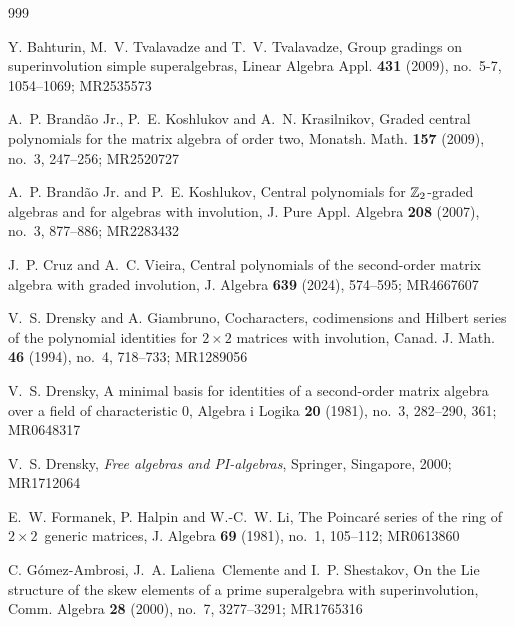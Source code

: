 \documentclass[11pt]{amsart}
\theoremstyle{definition}
\theoremstyle{remark}
\begin{document}
\begin{thebibliography}{999}



 Y. Bahturin, M.~V. Tvalavadze and T.~V. Tvalavadze, Group gradings on superinvolution simple superalgebras, Linear Algebra Appl. {\bf 431} (2009), no.~5-7, 1054--1069; MR2535573

 A.~P. Brand\~ao Jr., P.~E. Koshlukov and A.~N. Krasilnikov, Graded central polynomials for the matrix algebra of order two, Monatsh. Math. {\bf 157} (2009), no.~3, 247--256; MR2520727

  A.~P. Brand\~ao Jr. and P.~E. Koshlukov, Central polynomials for ${\Bbb Z}_2$-graded algebras and for algebras with involution, J. Pure Appl. Algebra {\bf 208} (2007), no.~3, 877--886; MR2283432

 J.~P. Cruz and A.~C. Vieira, Central polynomials of the second-order matrix algebra with graded involution, J. Algebra {\bf 639} (2024), 574--595; MR4667607


 V.~S. Drensky and A. Giambruno, Cocharacters, codimensions and Hilbert series of the polynomial identities for $2\times 2$ matrices with involution, Canad. J. Math. {\bf 46} (1994), no.~4, 718--733; MR1289056

 V.~S. Drensky, A minimal basis for identities of a second-order matrix algebra over a field of characteristic $0$, Algebra i Logika {\bf 20} (1981), no.~3, 282--290, 361; MR0648317

 V.~S. Drensky, {\it Free algebras and PI-algebras}, Springer, Singapore, 2000; MR1712064

 E.~W. Formanek, P. Halpin and W.-C.~W. Li, The Poincar\'e{} series of the ring of $2\times 2$\ generic matrices, J. Algebra {\bf 69} (1981), no.~1, 105--112; MR0613860

 C. G\'omez-Ambrosi, J.~A. Laliena~Clemente and I.~P. Shestakov, On the Lie structure of the skew elements of a prime superalgebra with superinvolution, Comm. Algebra {\bf 28} (2000), no.~7, 3277--3291; MR1765316


\end{thebibliography}
\end{document}
